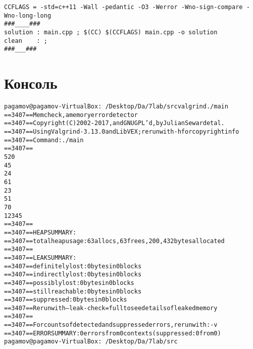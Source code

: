 \begin{lstlisting}
CCFLAGS = -std=c++11 -Wall -pedantic -O3 -Werror -Wno-sign-compare -Wno-long-long
###____###
solution : main.cpp ; $(CC) $(CCFLAGS) main.cpp -o solution
clean	 : ;
###___###
\end{lstlisting}

\pagebreak

\section{Консоль}

\begin{alltt}
pagamov@pagamov-VirtualBox:~/Desktop/Da/7lab/src valgrind ./main 
==3407== Memcheck, a memory error detector
==3407== Copyright (C) 2002-2017, and GNU GPL'd, by Julian Seward et al.
==3407== Using Valgrind-3.13.0 and LibVEX; rerun with -h for copyright info
==3407== Command: ./main
==3407== 
5 20
4 5
2 4
6 1
2 3
5 1
70
1 2 3 4 5 
==3407== 
==3407== HEAP SUMMARY:
==3407==   total heap usage: 63 allocs, 63 frees, 200,432 bytes allocated
==3407== 
==3407== LEAK SUMMARY:
==3407==    definitely lost: 0 bytes in 0 blocks
==3407==    indirectly lost: 0 bytes in 0 blocks
==3407==      possibly lost: 0 bytes in 0 blocks
==3407==    still reachable: 0 bytes in 0 blocks
==3407==         suppressed: 0 bytes in 0 blocks
==3407== Rerun with --leak-check=full to see details of leaked memory
==3407== 
==3407== For counts of detected and suppressed errors, rerun with: -v
==3407== ERROR SUMMARY: 0 errors from 0 contexts (suppressed: 0 from 0)
pagamov@pagamov-VirtualBox:~/Desktop/Da/7lab/src
\end{alltt}

\pagebreak